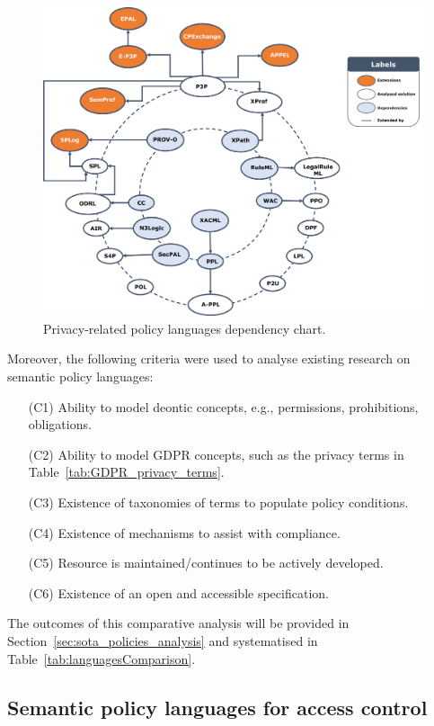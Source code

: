\begin{figure}[ht]
    \centering
    \includegraphics[width=\textwidth]{figures/chapter-2/languages.png}
    \caption{Privacy-related policy languages dependency chart.}
    \label{fig:lang-dependency-graph}
\end{figure}

Moreover, the following criteria were used to analyse existing research on semantic policy languages:
\begin{enumerate}
    \item[(C1)] Ability to model deontic concepts, e.g., permissions, prohibitions, obligations.
    \item[(C2)] Ability to model GDPR concepts, such as the privacy terms in Table~\ref{tab:GDPR_privacy_terms}.
    \item[(C3)] Existence of taxonomies of terms to populate policy conditions.
    \item[(C4)] Existence of mechanisms to assist with compliance.
    \item[(C5)] Resource is maintained/continues to be actively developed.
    \item[(C6)] Existence of an open and accessible specification.
\end{enumerate}

The outcomes of this comparative analysis will be provided in Section~\ref{sec:sota_policies_analysis} and systematised in Table~\ref{tab:languagesComparison}.

\subsection{Semantic policy languages for access control}
\label{sec:sota_policies_description}

